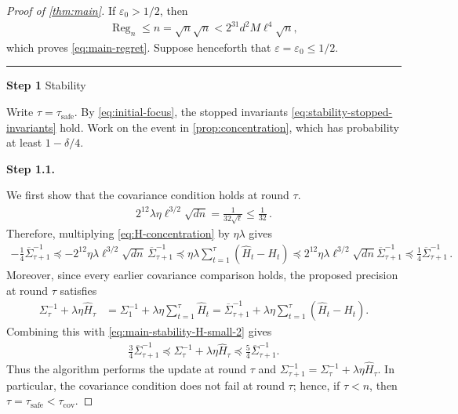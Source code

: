 \documentclass[11pt]{article}
\newcommand{\proofstep}[2]{%
    \par\medskip
    \noindent
    \textcolor{blue!55!black}{\rule{2pt}{1.2em}}%
    \hspace{0.6em}%
    {\sffamily\bfseries\color{blue!55!black}Step #1}%
    \quad
    {\sffamily #2}%
    \par\smallskip
}
\newcommand{\proofstepinline}[1]{%
    {\sffamily\bfseries\color{blue!55!black}Step #1.}\enspace
}
\newcommand{\1}{\mathbf 1}
\newcommand{\eps}{\varepsilon}
\begin{document}
\begin{proof}[Proof of \cref{thm:main}]
    If $\eps_0>1/2$, then
    \begin{align}
        \operatorname{Reg}_n
        \leq n
        =\sqrt n\sqrt n
        <2^{31}d^2M\ell^4\sqrt n,
    \end{align}
    which proves \eqref{eq:main-regret}.  Suppose henceforth that
    $\eps=\eps_0\leq1/2$.

    \proofstep{1}{Stability}
    Write $\tau=\tau_{\mathrm{safe}}$.
    By \eqref{eq:initial-focus}, the stopped invariants
    \eqref{eq:stability-stopped-invariants} hold.
    Work on the event in \cref{prop:concentration}, which has probability at
    least $1-\delta/4$.

    \proofstepinline{1.1}
    We first show that the covariance condition holds at round $\tau$.
    \begin{align}
        2^{12}\lambda\eta\ell^{3/2}\sqrt{dn}
        =
        \frac{1}{32\sqrt\ell}
        \leq\frac1{32}\,.
        \label{eq:main-stability-H-small}
    \end{align}
    Therefore, multiplying \eqref{eq:H-concentration} by $\eta\lambda$ gives
    \begin{align}
        -\frac14
        \overline\Sigma_{\tau+1}^{-1}
        \preceq
        -2^{12}\eta\lambda\ell^{3/2}\sqrt{dn}\,
        \overline\Sigma_{\tau+1}^{-1}
        \preceq
        \eta\lambda
        \sum_{t=1}^{\tau}
        (\widehat H_t-H_t)
        \preceq
        2^{12}\eta\lambda\ell^{3/2}\sqrt{dn}
        \overline\Sigma_{\tau+1}^{-1}
        \preceq
        \frac{1}{4}
        \overline\Sigma_{\tau+1}^{-1}\,.
        \label{eq:main-stability-H-small-2}
    \end{align}
    Moreover, since every earlier covariance comparison holds, the proposed
    precision at round $\tau$ satisfies
    \begin{align}
        \Sigma_{\tau}^{-1}
        +\lambda\eta\widehat H_{\tau}
         & =
        \Sigma_1^{-1}
        +\lambda\eta\sum_{t=1}^{\tau}\widehat H_t
        =
        \overline\Sigma_{\tau+1}^{-1}
        +
        \lambda\eta\sum_{t=1}^{\tau}
        (\widehat H_t-H_t).
    \end{align}
    Combining this with \eqref{eq:main-stability-H-small-2} gives
    \begin{align}
        \frac34\overline\Sigma_{\tau+1}^{-1}
        \preceq
        \Sigma_{\tau}^{-1}
        +\lambda\eta\widehat H_{\tau}
        \preceq\frac54\overline\Sigma_{\tau+1}^{-1}.
        \label{eq:main-strict-comparison}
    \end{align}
    Thus the algorithm performs the update at round $\tau$ and
    $\Sigma_{\tau+1}^{-1}
        =\Sigma_{\tau}^{-1}
        +\lambda\eta\widehat H_{\tau}$.
    In particular, the covariance condition does not fail at round $\tau$;
    hence, if $\tau<n$, then
    $\tau=\tau_{\mathrm{safe}}<\tau_{\mathrm{cov}}$.


\end{proof}
\end{document}
